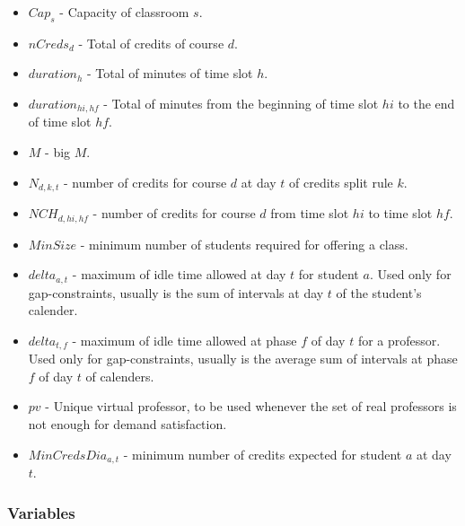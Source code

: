 \begin{itemize}
\item $Cap_{s}$ - Capacity of classroom $s$.
\item $nCreds_{d}$ - Total of credits of course $d$.
\item $duration_{h}$ - Total of minutes of time slot $h$.
\item $duration_{hi,hf}$ - Total of minutes from the beginning of time slot $hi$ to the end of time slot $hf$.
\item $M$ - big $M$.
\item $N_{d,k,t}$ - number of credits for course $d$ at day $t$ of credits split rule $k$.
\item $NCH_{d,hi,hf}$ - number of credits for course $d$ from time slot $hi$ to time slot $hf$.
\item $MinSize$ - minimum number of students required for offering a class.
\item $delta_{a,t}$ - maximum of idle time allowed at day $t$ for student $a$. Used only for gap-constraints, usually is the sum of intervals at day $t$ of the student's calender.
\item $delta_{t,f}$ - maximum of idle time allowed at phase $f$ of day $t$ for a professor. Used only for gap-constraints, usually is the average sum of intervals at phase $f$ of day $t$ of calenders.
\item $pv$ - Unique virtual professor, to be used whenever the set of real professors is not enough for demand satisfaction.
\item $MinCredsDia_{a,t}$ - minimum number of credits expected for student $a$ at day $t$.
\end{itemize}

\subsubsection{Variables}

